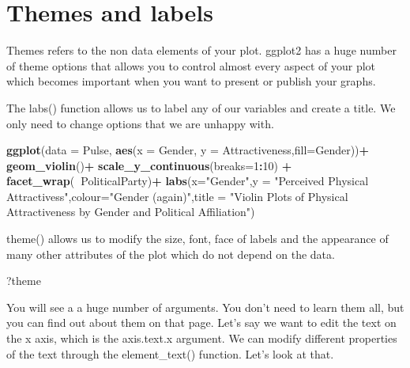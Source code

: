 \documentclass[]{book}
\newenvironment{Shaded}{\begin{snugshade}}{\end{snugshade}}
\newcommand{\DataTypeTok}[1]{\textcolor[rgb]{0.13,0.29,0.53}{#1}}
\newcommand{\DecValTok}[1]{\textcolor[rgb]{0.00,0.00,0.81}{#1}}
\newcommand{\KeywordTok}[1]{\textcolor[rgb]{0.13,0.29,0.53}{\textbf{#1}}}
\newcommand{\NormalTok}[1]{#1}
\newcommand{\OperatorTok}[1]{\textcolor[rgb]{0.81,0.36,0.00}{\textbf{#1}}}
\newcommand{\StringTok}[1]{\textcolor[rgb]{0.31,0.60,0.02}{#1}}
\begin{document}
\hypertarget{themes-and-labels}{%
\section{Themes and labels}\label{themes-and-labels}}

Themes refers to the non data elements of your plot. ggplot2 has a huge number of theme options that allows you to control almost every aspect of your plot which becomes important when you want to present or publish your graphs.

The labs() function allows us to label any of our variables and create a title. We only need to change options that we are unhappy with.

\begin{Shaded}
\begin{Highlighting}[]
\KeywordTok{ggplot}\NormalTok{(}\DataTypeTok{data =}\NormalTok{ Pulse,  }\KeywordTok{aes}\NormalTok{(}\DataTypeTok{x =}\NormalTok{ Gender, }\DataTypeTok{y =}\NormalTok{ Attractiveness,}\DataTypeTok{fill=}\NormalTok{Gender))}\OperatorTok{+}
\StringTok{  }\KeywordTok{geom_violin}\NormalTok{()}\OperatorTok{+}
\StringTok{    }\KeywordTok{scale_y_continuous}\NormalTok{(}\DataTypeTok{breaks=}\DecValTok{1}\OperatorTok{:}\DecValTok{10}\NormalTok{) }\OperatorTok{+}
\StringTok{     }\KeywordTok{facet_wrap}\NormalTok{(}\OperatorTok{~}\NormalTok{PoliticalParty)}\OperatorTok{+}
\StringTok{      }\KeywordTok{labs}\NormalTok{(}\DataTypeTok{x=}\StringTok{"Gender"}\NormalTok{,}\DataTypeTok{y =} \StringTok{"Perceived Physical Attractivess"}\NormalTok{,}\DataTypeTok{colour=}\StringTok{"Gender (again)"}\NormalTok{,}\DataTypeTok{title =} \StringTok{"Violin Plots of Physical Attractiveness by Gender and Political   Affiliation"}\NormalTok{)}
\end{Highlighting}
\end{Shaded}

theme() allows us to modify the size, font, face of labels and the appearance of many other attributes of the plot which do not depend on the data.

\begin{Shaded}
\begin{Highlighting}[]
\NormalTok{?theme}
\end{Highlighting}
\end{Shaded}

You will see a a huge number of arguments. You don't need to learn them all, but you can find out about them on that page. Let's say we want to edit the text on the x axis, which is the axis.text.x argument. We can modify different properties of the text through the element\_text() function. Let's look at that.
\end{document}
